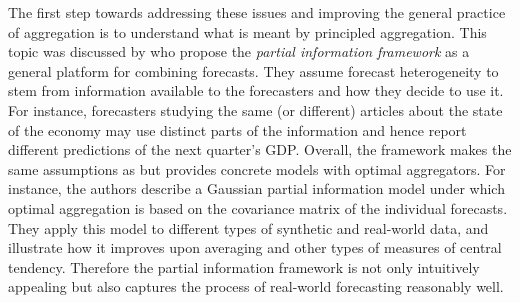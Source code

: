 \documentclass[11pt]{article}
\theoremstyle{definition}
\theoremstyle{definition}
\begin{document}

The first step towards addressing these issues and improving the general practice of aggregation  is to understand what is meant by principled aggregation. This topic was discussed by \cite{satopaamodeling2, satopaamodeling} who propose the \textit{partial information 
framework} as a general platform for combining forecasts. They assume forecast heterogeneity to stem from information available to the forecasters and how they decide to use it. For instance, forecasters studying the same (or different) articles about the state of the economy may use distinct parts of the information and hence report different predictions of the next quarter's GDP. Overall, the framework makes the same assumptions as \cite{Ranjan08} but provides concrete models with optimal aggregators. 
For instance, the authors describe a Gaussian partial information model under which optimal aggregation is based on the covariance matrix of the individual forecasts. They apply this model to different types of synthetic and real-world data, and illustrate how it improves upon averaging and other types of measures of central tendency. Therefore the partial information framework is not only intuitively appealing but also captures the process of real-world forecasting reasonably well. 
%
\end{document}
